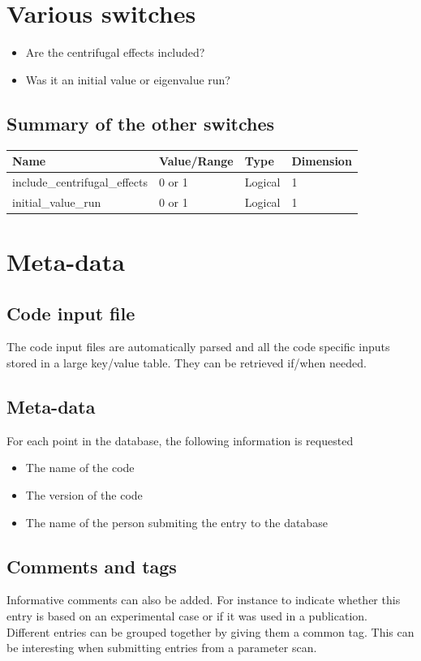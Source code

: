 \documentclass[fleqn]{report}
\begin{document}
\section{Various switches} \label{sec:rotswitches}
\begin{itemize}
\item Are the centrifugal effects included?  
\item Was it an initial value or eigenvalue run?
\end{itemize}

\subsection{Summary of the other switches}
\begin{tabularx}{\textwidth}{|X|Y|Y|Y|}
\hline
Name & Value/Range & Type & Dimension \\
\hline
include\_centrifugal\_effects &  0 or 1 & Logical & 1 \\
initial\_value\_run &  0 or 1 & Logical & 1 \\
\hline
\end{tabularx}

\section{Meta-data}

\subsection{Code input file}
The code input files are automatically parsed and all the code specific inputs stored in a large key/value table. They can be retrieved if/when needed.

\subsection{Meta-data}
For each point in the database, the following information is requested 
\begin{itemize}
 \item The name of the code 
 \item The version of the code
 \item The name of the person submiting the entry to the database
\end{itemize}

\subsection{Comments and tags}
Informative comments can also be added. For instance to indicate whether this entry is based on an experimental case or if it was used in a publication.\\
Different entries can be grouped together by giving them a common tag. This can be interesting when submitting entries from a parameter scan.
 
\end{document}
